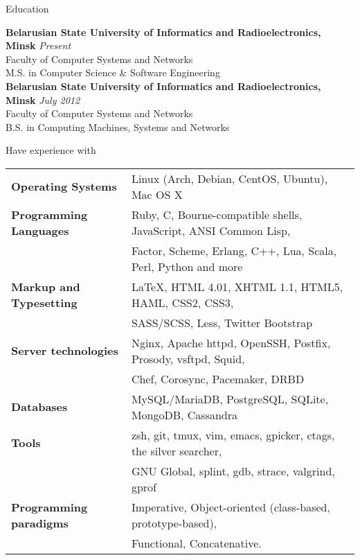 \documentclass{resume} %
\begin{document}

\begin{rSection}{Education}

{\bf Belarusian State University of Informatics and Radioelectronics, Minsk} \hfill {\em Present} \\ 
Faculty of Computer Systems and Networks \\
M.S. in Computer Science \& Software Engineering \smallskip \\
{\bf Belarusian State University of Informatics and Radioelectronics, Minsk} \hfill {\em July 2012} \\ 
Faculty of Computer Systems and Networks \\
B.S. in Computing Machines, Systems and Networks \\

\end{rSection}


\begin{rSection}{Have experience with}

\begin{tabular}{ @{} >{\bfseries}l @{\hspace{6ex}} l }
Operating Systems     & Linux (Arch, Debian, CentOS, Ubuntu), Mac OS X \smallskip \\
Programming Languages & Ruby, C, Bourne-compatible shells, JavaScript, ANSI Common Lisp, \\
                      & Factor, Scheme, Erlang, C++, Lua, Scala, Perl, Python and more\smallskip \\
Markup and Typesetting & \LaTeX, HTML 4.01, XHTML 1.1, HTML5, HAML, CSS2, CSS3, \\
                       & SASS/SCSS, Less, Twitter Bootstrap \smallskip \\
Server technologies   & Nginx, Apache httpd, OpenSSH, Postfix, Prosody, vsftpd, Squid, \\
                      & Chef, Corosync, Pacemaker, DRBD \smallskip \\
Databases & MySQL/MariaDB, PostgreSQL, SQLite, MongoDB, Cassandra \smallskip \\
Tools & zsh, git, tmux, vim, emacs, gpicker, ctags, the silver searcher, \\
      &    GNU Global, splint, gdb, strace, valgrind, gprof \smallskip \\
Programming paradigms & Imperative, Object-oriented (class-based, prototype-based), \\
                      & Functional, Concatenative.
\end{tabular}

\end{rSection}
\end{document}
